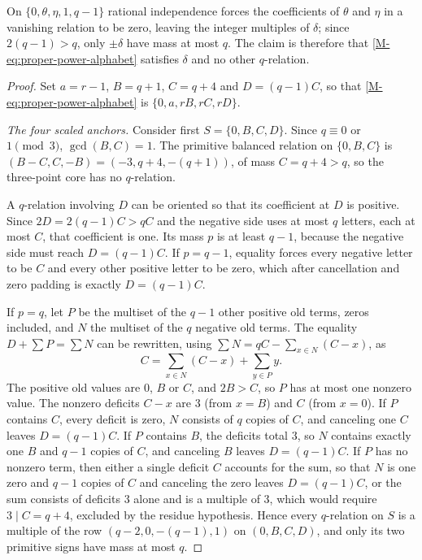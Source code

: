 \documentclass[11pt,reqno]{amsart}
\theoremstyle{plain}
\theoremstyle{definition}
\theoremstyle{plain}
\theoremstyle{plain}
\theoremstyle{plain}
\theoremstyle{plain}
\theoremstyle{plain}
\theoremstyle{plain}
\theoremstyle{definition}
\theoremstyle{definition}
\theoremstyle{definition}
\theoremstyle{plain}
\begin{document}
On $\{0,\theta,\eta,1,q-1\}$ rational independence forces the coefficients
of $\theta$ and $\eta$ in a vanishing relation to be zero, leaving the
integer multiples of $\delta$; since $2(q-1)>q$, only $\pm\delta$ have mass
at most $q$. The claim is therefore that \eqref{M-eq:proper-power-alphabet}
satisfies $\delta$ and no other $q$-relation.

\begin{proof}
Set $a=r-1$, $B=q+1$, $C=q+4$ and $D=(q-1)C$, so that
\eqref{M-eq:proper-power-alphabet} is $\{0,a,rB,rC,rD\}$.

\smallskip\noindent\emph{The four scaled anchors.}
Consider first $S=\{0,B,C,D\}$. Since $q\equiv0$ or $1\pmod3$,
$\gcd(B,C)=1$. The primitive balanced relation on $\{0,B,C\}$ is
$(B-C,C,-B)=(-3,q+4,-(q+1))$, of mass $C=q+4>q$, so the three-point core
has no $q$-relation.

A $q$-relation involving $D$ can be oriented so that its coefficient at
$D$ is positive. Since $2D=2(q-1)C>qC$ and the negative side uses at most
$q$ letters, each at most $C$, that coefficient is one. Its mass $p$ is at
least $q-1$, because the negative side must reach $D=(q-1)C$. If $p=q-1$,
equality forces every negative letter to be $C$ and every other positive
letter to be zero, which after cancellation and zero padding is exactly
$D=(q-1)C$.

If $p=q$, let $P$ be the multiset of the $q-1$ other positive old terms,
zeros included, and $N$ the multiset of the $q$ negative old terms. The
equality $D+\sum P=\sum N$ can be rewritten, using
$\sum N=qC-\sum_{x\in N}(C-x)$, as
\begin{equation}\label{M-eq:deficit-identity}
 C=\sum_{x\in N}(C-x)+\sum_{y\in P}y .
\end{equation}
The positive old values are $0$, $B$ or $C$, and $2B>C$, so $P$ has at
most one nonzero value. The nonzero deficits $C-x$ are $3$ (from $x=B$)
and $C$ (from $x=0$). If $P$ contains $C$, every deficit is zero, $N$
consists of $q$ copies of $C$, and canceling one $C$ leaves $D=(q-1)C$.
If $P$ contains $B$, the deficits total $3$, so $N$ contains exactly one
$B$ and $q-1$ copies of $C$, and canceling $B$ leaves $D=(q-1)C$. If $P$
has no nonzero term, then either a single deficit $C$ accounts for the sum,
so that $N$ is one zero and $q-1$ copies of $C$ and canceling the zero
leaves $D=(q-1)C$, or the sum consists of deficits $3$ alone and is a
multiple of $3$, which would require $3\mid C=q+4$, excluded by the
residue hypothesis. Hence every $q$-relation on $S$ is a multiple of the
row $(q-2,0,-(q-1),1)$ on $(0,B,C,D)$, and only its two primitive signs
have mass at most $q$.


\end{proof}
\end{document}
